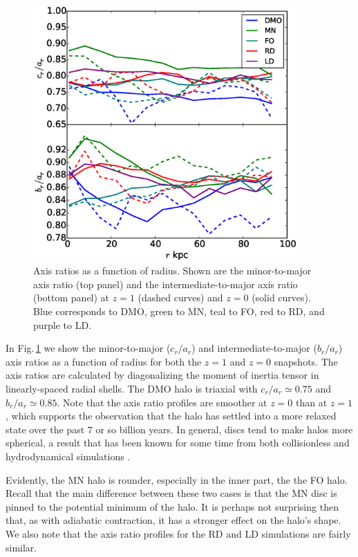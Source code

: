 \begin{figure} 
\centering 
\includegraphics[width=0.9\textwidth]{../figures/eigenratios_vs_radius.eps} 
\caption{Axis ratios as a function of radius.  Shown are the
  minor-to-major axis ratio (top panel) and the intermediate-to-major
  axis ratio (bottom panel) at $z=1$ (dashed curves) and $z=0$ (solid
  curves).  Blue corresponds to DMO, green to MN, teal to FO, red to RD, and
  purple to LD.}
\label{fig:axis_ratios}
\end{figure}

In Fig.\,\ref{fig:axis_ratios} we show the minor-to-major ($c_r/a_r$)
and intermediate-to-major ($b_r/a_r$) axis ratios as a function of
radius for both the $z=1$ and $z=0$ snapshots.  The axis ratios are
calculated by diagonalizing the moment of inertia tensor in
linearly-spaced radial shells.  The DMO halo is triaxial with
$c_r/a_r\simeq 0.75$ and $b_r/a_r\simeq 0.85$.  Note that the axis
ratio profiles are smoother at $z=0$ than at $z=1$, which supports the
observation that the halo has settled into a more relaxed state over
the past $7$ or so billion years.  In general, discs tend to make
halos more spherical, a result that has been known for some time from
both collisionless and hydrodynamical simulations
\citep[e.g.][]{dubinski1994_ApJ431_617,Zemp2012}.


Evidently, the MN halo is rounder, especially in the inner part, the
the FO halo.  Recall that the main difference between these two cases
is that the MN disc is pinned to the potential minimum of the halo.
It is perhaps not surprising then that, as with adiabatic contraction,
it has a stronger effect on the halo's shape.  
We also note that the axis ratio profiles for the RD and LD simulations
are fairly similar.  

